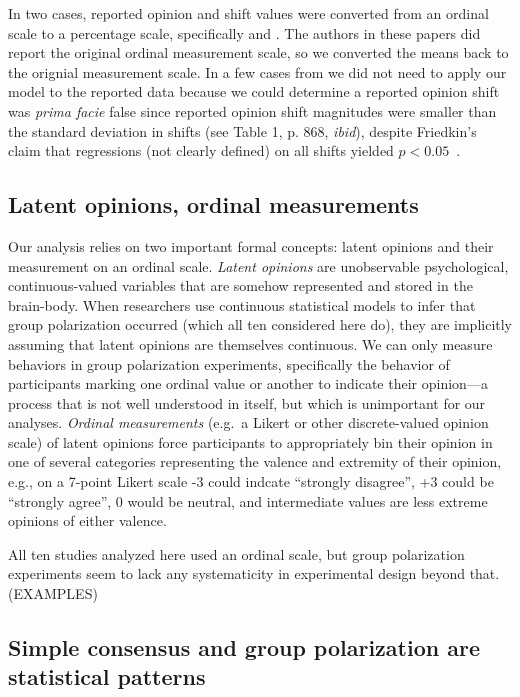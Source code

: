 \documentclass[12pt, letterpaper]{article}
\begin{document}
In two cases, reported opinion and shift values were converted from an ordinal
scale to a percentage scale, specifically  and .
The authors in these papers did report the original ordinal measurement scale,
so we converted the means back to the orignial measurement scale.
In a few cases from  we did not need to apply our 
model to the reported data because we could determine a reported opinion shift was 
\emph{prima facie} false since reported opinion shift magnitudes
were smaller than the standard deviation in shifts (see Table 1, p. 868, \emph{ibid}),
despite Friedkin's claim that regressions (not clearly defined) on all shifts 
yielded $p < 0.05$~\cite{Kruschke2018c}.


\subsection{Latent opinions, ordinal measurements}

Our analysis relies on two important formal concepts: latent opinions and their 
measurement on an ordinal scale. \emph{Latent opinions} are unobservable psychological,
continuous-valued variables that are somehow represented and stored in the
brain-body. 
When researchers use continuous statistical models to infer 
that group polarization occurred (which all ten considered here do), 
they are implicitly assuming that latent opinions are themselves continuous.
We can only measure behaviors in group polarization experiments,
specifically the behavior of participants marking one ordinal value or another
to indicate their opinion---a process that is not well understood in itself,
but which is unimportant for our analyses. \emph{Ordinal measurements} (e.g.\
a Likert or other discrete-valued opinion scale) of latent opinions force
participants to appropriately bin their opinion in one of several categories
representing the valence and extremity of their opinion, e.g., on a
7-point Likert scale -3 could indcate
``strongly disagree'', +3 could be ``strongly agree'', 0 would be neutral, and 
intermediate values are less extreme opinions of either valence.

All ten studies analyzed here used an ordinal scale, but group polarization experiments seem to
lack any systematicity in experimental design beyond that. (EXAMPLES)

\subsection{Simple consensus and group polarization are statistical patterns}
\end{document}

